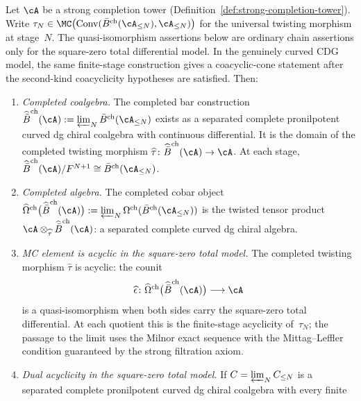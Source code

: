 \begin{theorem}
\label{thm:completed-bar-cobar-strong}
\ClaimStatusConditional
{}
Let $\cA$ be a strong completion tower
\textup{(}Definition~\textup{\ref{def:strong-completion-tower})}.
Write $\tau_N \in \MC\bigl(\operatorname{Conv}(\bar B^{\mathrm{ch}}
(\cA_{\le N}), \cA_{\le N})\bigr)$ for the universal twisting
morphism at stage~$N$. The quasi-isomorphism assertions below are
ordinary chain assertions only for the square-zero total differential
model. In the genuinely curved CDG model, the same finite-stage
construction gives a coacyclic-cone statement after the second-kind
coacyclicity hypotheses are satisfied. Then:
\begin{enumerate}
\item \emph{Completed coalgebra.}
 The completed bar construction
 $\widehat{\bar B}^{\mathrm{ch}}(\cA)
 := \varprojlim_N \bar B^{\mathrm{ch}}(\cA_{\le N})$
 exists as a separated complete pronilpotent curved dg chiral
 coalgebra with continuous differential.
 It is the domain of the completed twisting morphism
 $\widehat\tau\colon \widehat{\bar B}^{\mathrm{ch}}(\cA) \to \cA$.
 At each stage,
 $\widehat{\bar B}^{\mathrm{ch}}(\cA)/F^{N+1}
 \cong \bar B^{\mathrm{ch}}(\cA_{\le N})$.
\item \emph{Completed algebra.}
 The completed cobar object
 $\widehat\Omega^{\mathrm{ch}}\bigl(
 \widehat{\bar B}^{\mathrm{ch}}(\cA)\bigr)
 := \varprojlim_N \Omega^{\mathrm{ch}}(
 \bar B^{\mathrm{ch}}(\cA_{\le N}))$
 is the twisted tensor product
 $\cA \otimes_{\widehat\tau}
 \widehat{\bar B}^{\mathrm{ch}}(\cA)$:
 a separated complete curved dg chiral algebra.
\item \emph{MC element is acyclic in the square-zero total model.}
 The completed twisting morphism $\widehat\tau$ is acyclic:
 the counit
 \[
 \widehat\epsilon \colon
 \widehat\Omega^{\mathrm{ch}}\bigl(
 \widehat{\bar B}^{\mathrm{ch}}(\cA)\bigr)
 \longrightarrow \cA
 \]
 is a quasi-isomorphism when both sides carry the square-zero total
 differential. At each quotient this is the
 finite-stage acyclicity of~$\tau_N$; the passage to the
 limit uses the Milnor exact sequence with the
 Mittag--Leffler condition guaranteed by the strong
 filtration axiom.
\item \emph{Dual acyclicity in the square-zero total model.}
 If $C = \varprojlim_N C_{\le N}$ is a separated complete
 pronilpotent curved dg chiral coalgebra with every finite

\end{enumerate}
\end{theorem}
